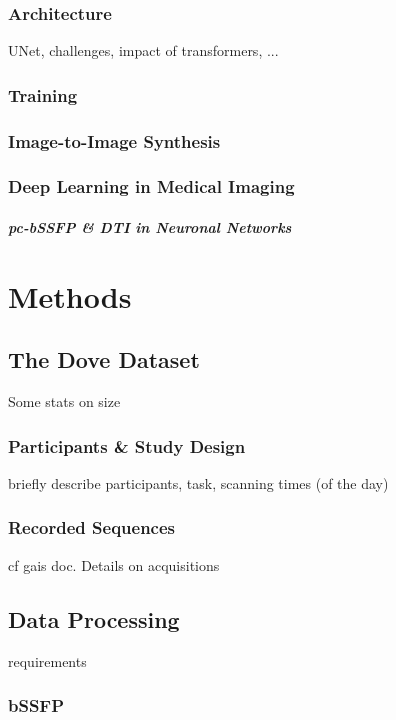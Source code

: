 \subsection{Architecture}
UNet, challenges, impact of transformers, ...

\subsection{Training}

\subsection{Image-to-Image Synthesis}

\subsection{Deep Learning in Medical Imaging}

\paragraph{pc-bSSFP \& DTI in Neuronal Networks}




\chapter{Methods}\label{\positionnumber} 
\section{The Dove Dataset}
Some stats on size 
\subsection{Participants \& Study Design}
briefly describe participants, task, scanning times (of the day)

\subsection{Recorded Sequences}
cf gais doc.
Details on acquisitions

\section{Data Processing}
requirements
\subsection{bSSFP}

